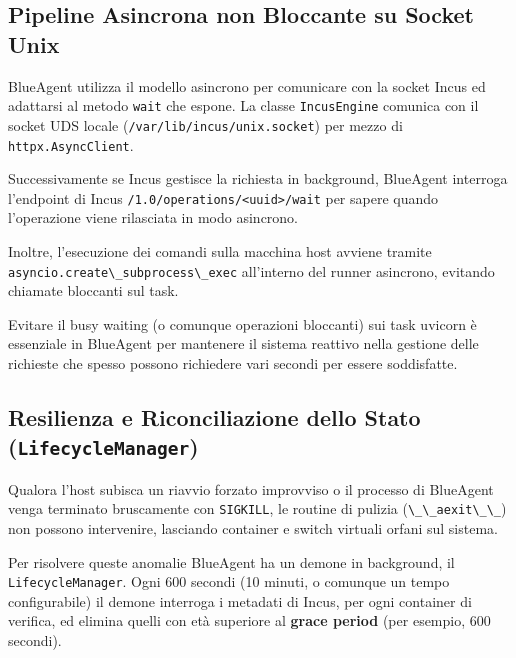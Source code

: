 \subsection{Pipeline Asincrona non Bloccante su Socket
Unix}\label{pipeline-asincrona-non-bloccante-su-socket-unix}

BlueAgent utilizza il modello asincrono per comunicare con la socket
Incus ed adattarsi al metodo \passthrough{\lstinline!wait!} che espone.
La classe \passthrough{\lstinline!IncusEngine!} comunica con il socket
UDS locale (\passthrough{\lstinline!/var/lib/incus/unix.socket!}) per
mezzo di \passthrough{\lstinline!httpx.AsyncClient!}.

Successivamente se Incus gestisce la richiesta in background, BlueAgent
interroga l'endpoint di Incus
\passthrough{\lstinline!/1.0/operations/<uuid>/wait!} per sapere quando
l'operazione viene rilasciata in modo asincrono.

Inoltre, l'esecuzione dei comandi sulla macchina host avviene tramite
\passthrough{\lstinline!asyncio.create\_subprocess\_exec!} all'interno
del runner asincrono, evitando chiamate bloccanti sul task.

Evitare il busy waiting (o comunque operazioni bloccanti) sui task
uvicorn è essenziale in BlueAgent per mantenere il sistema reattivo
nella gestione delle richieste che spesso possono richiedere vari
secondi per essere soddisfatte.

\subsection{\texorpdfstring{Resilienza e Riconciliazione dello Stato
(\texttt{LifecycleManager})}{Resilienza e Riconciliazione dello Stato (LifecycleManager)}}\label{resilienza-e-riconciliazione-dello-stato-lifecyclemanager}

Qualora l'host subisca un riavvio forzato improvviso o il processo di
BlueAgent venga terminato bruscamente con
\passthrough{\lstinline!SIGKILL!}, le routine di pulizia
(\passthrough{\lstinline!\_\_aexit\_\_!}) non possono intervenire,
lasciando container e switch virtuali orfani sul sistema.

Per risolvere queste anomalie BlueAgent ha un demone in background, il
\passthrough{\lstinline!LifecycleManager!}. Ogni 600 secondi (10 minuti,
o comunque un tempo configurabile) il demone interroga i metadati di
Incus, per ogni container di verifica, ed elimina quelli con età
superiore al \textbf{grace period} (per esempio, 600 secondi).

